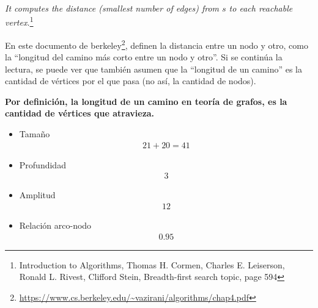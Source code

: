 \textit{It computes the distance (smallest number of edges) from $s$ to each reachable vertex.}\footnote{Introduction to Algorithms, Thomas H. Cormen, Charles E. Leiserson, Ronald L. Rivest, Clifford Stein, Breadth-first search topic, page 594}

En este documento de berkeley\footnote{\url{https://www.cs.berkeley.edu/~vazirani/algorithms/chap4.pdf}}, definen la distancia entre un nodo y otro, como la ``longitud del camino más corto entre un nodo y otro''. Si se continúa la lectura, se puede ver que también asumen que la ``longitud de un camino'' es la cantidad de vértices por el que pasa (no así, la cantidad de nodos).

\textbf{Por definición, la longitud de un camino en teoría de grafos, es la cantidad de vértices que atravieza.}

\begin{itemize}
\item Tamaño
  \begin{align*}
    21 + 20 = 41
  \end{align*}

\item Profundidad
  \begin{align*}
    3
  \end{align*}

\item Amplitud
  \begin{align*}
    12
  \end{align*}

\item Relación arco-nodo
  \begin{align*}
    0.95
  \end{align*}
\end{itemize}
